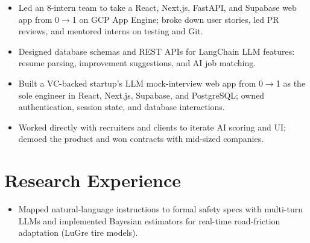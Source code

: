 \documentclass[11pt, letterpaper]{article}
\begin{document}
\vspace{1pt}
\begin{itemize}
  \item Led an 8-intern team to take a React, Next.js, FastAPI, and Supabase web app from 0$\to$1 on GCP App Engine; broke down user stories, led PR reviews, and mentored interns on testing and Git.
  \item Designed database schemas and REST APIs for LangChain LLM features: resume parsing, improvement suggestions, and AI job matching.
\end{itemize}

\vspace{1pt}
\begin{itemize}
  \item Built a VC-backed startup's LLM mock-interview web app from 0$\to$1 as the sole engineer in React, Next.js, Supabase, and PostgreSQL; owned authentication, session state, and database interactions.
  \item Worked directly with recruiters and clients to iterate AI scoring and UI; demoed the product and won contracts with mid-sized companies.
\end{itemize}

\section{Research Experience}
\begin{itemize}
  \item Mapped natural-language instructions to formal safety specs with multi-turn LLMs and implemented Bayesian estimators for real-time road-friction adaptation (LuGre tire models).
\end{itemize}
\end{document}
